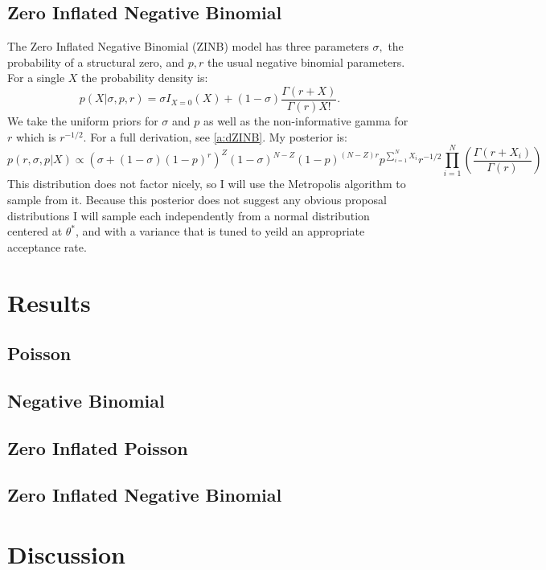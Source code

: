 \documentclass{article}\usepackage[]{graphicx}\usepackage[]{color}
\begin{document}
\subsection{Zero Inflated Negative Binomial}
\label{ss:mZiNBinom}
The Zero Inflated Negative Binomial (ZINB) model has three parameters $\sigma,$ the probability of a structural zero, and $p,r$ the usual negative binomial parameters. 
For a single $X$ the probability density is: 
$$p(X|\sigma, p, r) = \sigma I_{X=0}(X) + (1-\sigma)\frac{\Gamma(r+X)}{\Gamma(r)X!}.$$
We take the uniform priors for $\sigma$ and $p$ as well as the non-informative gamma for $r$ which is $r^{-1/2}$. For a full derivation, see \ref{a:dZINB}. My posterior is:
$$p(r,\sigma, p|X)\propto\left(\sigma + (1-\sigma)(1-p)^r\right)^Z(1-\sigma)^{N-Z}(1-p)^{(N-Z)r}p^{\sum_{i=1}^NX_i}r^{-1/2}\prod_{i=1}^N\left(\frac{\Gamma(r+X_i)}{\Gamma(r)}\right)$$
This distribution does not factor nicely, so I will use the Metropolis algorithm to sample from it. 
Because this posterior does not suggest any obvious proposal distributions I will sample each independently from a normal distribution centered at $\theta^*$, and with a variance that is tuned to yeild an appropriate acceptance rate.

\section{Results}
\label{s:results}
\subsection{Poisson}
\label{ss:rPoisson}

\subsection{Negative Binomial}
\label{ss:rNBinom}

\subsection{Zero Inflated Poisson}
\label{ss:rZiPoisson}

\subsection{Zero Inflated Negative Binomial}
\label{ss:rZiNBinom}

\section{Discussion}
\label{s:discussion}
\end{document}
